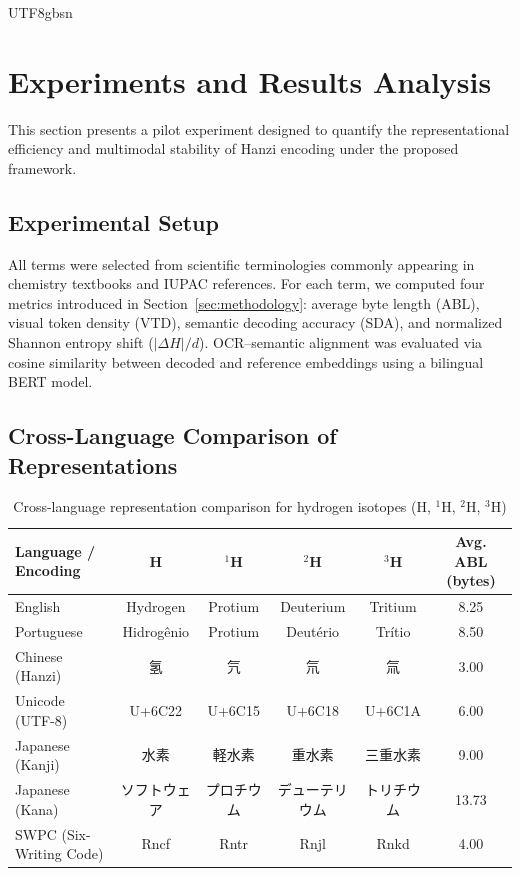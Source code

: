 \documentclass[conference]{IEEEtran}
\begin{document}
\begin{CJK*}{UTF8}{gbsn}
\vspace{0.1cm}
\section{Experiments and Results Analysis}
\label{sec:results}
This section presents a pilot experiment designed to quantify the representational efficiency and multimodal stability of Hanzi encoding under the proposed framework.  

\subsection{Experimental Setup}

All terms were selected from scientific terminologies commonly appearing in chemistry textbooks and IUPAC references.  
For each term, we computed four metrics introduced in Section~\ref{sec:methodology}:  
average byte length (ABL), visual token density (VTD), semantic decoding accuracy (SDA), and normalized Shannon entropy shift ($|\Delta H|/d$).  
OCR–semantic alignment was evaluated via cosine similarity between decoded and reference embeddings using a bilingual BERT model.

\subsection{Cross-Language Comparison of Representations}

\begin{table}[htbp]
\centering
\caption{Cross-language representation comparison for hydrogen isotopes (H, $^{1}$H, $^{2}$H, $^{3}$H)}
\label{tab:isotope_comparison}
\footnotesize
\renewcommand{\arraystretch}{1.2}
\begin{tabular}{lccccc}
\toprule
\textbf{Language / Encoding} & \textbf{H} & \textbf{$^{1}$H} & \textbf{$^{2}$H} & \textbf{$^{3}$H} & \textbf{Avg. ABL (bytes)} \\
\midrule
English & Hydrogen & Protium & Deuterium & Tritium & 8.25 \\
Portuguese & Hidrogênio & Protium & Deutério & Trítio & 8.50 \\
Chinese (Hanzi) & 氢 & 氕 & 氘 & 氚 & 3.00 \\
Unicode (UTF-8) & U+6C22 & U+6C15 & U+6C18 & U+6C1A & 6.00 \\
Japanese (Kanji) & 水素 & 軽水素 & 重水素 & 三重水素 & 9.00 \\
Japanese (Kana) & ソフトウェア & プロチウム & デューテリウム & トリチウム & 13.73 \\
SWPC (Six-Writing Code) & Rncf & Rntr & Rnjl & Rnkd & 4.00 \\
\bottomrule
\end{tabular}
\end{table}




\end{CJK*}
\end{document}
